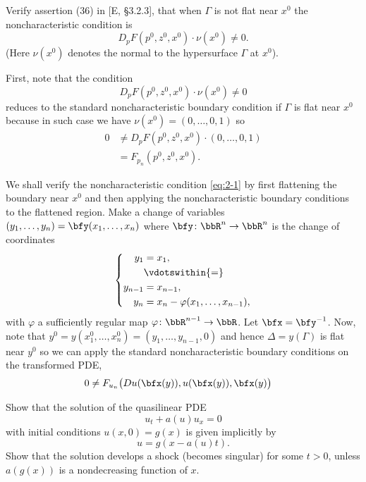 \begin{problem}
  Verify assertion (36) in [E, \S 3.2.3], that when \(\Gamma\) is not flat
  near \(x^0\) the noncharacteristic condition is
  \[
    D_pF(p^0,z^0,x^0)\cdot \nu(x^0)\neq 0.
  \]
  (Here \(\nu(x^0)\) denotes the normal to the hypersurface \(\Gamma\) at
  \(x^0\)).
\end{problem}
\begin{solution}
  First, note that the condition
  \begin{equation}
    \label{eq:2-1}
    D_pF(p^0,z^0,x^0)\cdot \nu(x^0)\neq 0
  \end{equation}
  reduces to the standard noncharacteristic boundary condition if
  \(\Gamma\) is flat near \(x^0\) because in such case we have
  \(\nu(x^0)=(0,\dotsc,0,1)\) so
  \begin{align*}
    0&\neq D_pF(p^0,z^0,x^0)\cdot (0,\dotsc,0,1)\\
     &=F_{p_n}(p^0,z^0,x^0).
  \end{align*}

  We shall verify the noncharacteristic condition \eqref{eq:2-1} by first
  flattening the boundary near \(x^0\) and then applying the
  noncharacteristic boundary conditions to the flattened region. Make a
  change of variables \((y_1,\dotsc,y_n)=\bfy(x_1,\dotsc,x_n)\) where
  \(\bfy\colon\bbR^n\to\bbR^n\) is the change of coordinates
  \[
    \left\{
      \begin{aligned}
        y_1&=x_1,\\
        &\vdotswithin{=}\\
        y_{n-1}&=x_{n-1},\\
        y_n&=x_n-\varphi(x_1,\dotsc,x_{n-1}),
      \end{aligned}
    \right.
  \]
  with \(\varphi\) a sufficiently regular map
  \(\varphi\colon\bbR^{n-1}\to\bbR\). Let \(\bfx=\bfy^{-1}\). Now, note
  that \(y^0=y(x_1^0,\dotsc,x_n^0)=(y_1,\dotsc,y_{n-1},0)\) and hence
  \(\Delta=y(\Gamma)\) is flat near \(y^0\) so we can apply the standard
  noncharacteristic boundary conditions on the transformed PDE,
  \begin{align*}
    0&\neq F_{u_n}\bigl(Du(\bfx(y)),u(\bfx(y)),\bfx(y)\bigr)
  \end{align*}
\end{solution}
\newpage

\begin{problem}
  Show that the solution of the quasilinear PDE
  \[
    u_t+a(u)u_x=0
  \]
  with initial conditions \(u(x,0)=g(x)\) is given implicitly by
  \[
    u=g(x-a(u)t).
  \]
  Show that the solution develops a shock (becomes singular) for some
  \(t>0\), unless \(a(g(x))\) is a nondecreasing function of
  \(x\).
\end{problem}
\begin{solution}

\end{solution}
\newpage

